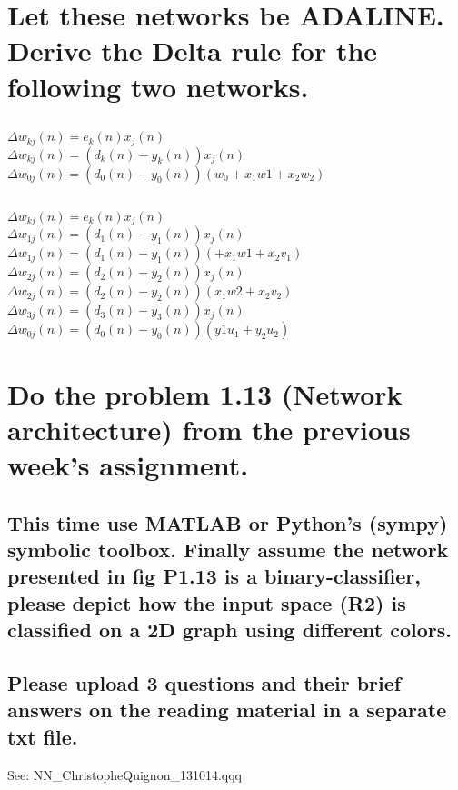 \documentclass{scrartcl}
\begin{document}
\section{Let these networks be ADALINE. Derive the Delta rule for the following two networks.}
\subsection{}
$\Delta w_{kj}(n)=e_{k}(n)x_{j}(n)$\\
$\Delta w_{kj}(n)=(d_{k}(n)-y_{k}(n))x_{j}(n)$\\
$\Delta w_{0j}(n)=(d_{0}(n)-y_{0}(n))
(w_{0}+x_{1}w{1}+x_{2}w_{2})$\\

\subsection{}
$\Delta w_{kj}(n)=e_{k}(n)x_{j}(n)$\\

$\Delta w_{1j}(n)=(d_{1}(n)-y_{1}(n))x_{j}(n)$\\
$\Delta w_{1j}(n)=(d_{1}(n)-y_{1}(n))
(+x_{1}w{1}+x_{2}v_{1})$\\

$\Delta w_{2j}(n)=(d_{2}(n)-y_{2}(n))x_{j}(n)$\\
$\Delta w_{2j}(n)=(d_{2}(n)-y_{2}(n))
(x_{1}w{2}+x_{2}v_{2})$\\



$\Delta w_{3j}(n)=(d_{3}(n)-y_{3}(n))x_{j}(n)$\\
$\Delta w_{0j}(n)=(d_{0}(n)-y_{0}(n))
(y{1}u_{1}+y_{2}u_{2})$\\

\section{Do the problem 1.13 (Network architecture) from the previous week’s assignment.}
\subsection{This time use MATLAB or Python’s (sympy) symbolic toolbox. Finally assume the network
presented in fig P1.13 is a binary-classifier, please depict how the input space (R2) is classified
on a 2D graph using different colors.}



\subsection{Please upload 3 questions and their brief answers on the reading material in a separate txt
file.
}
See:  NN\_ChristopheQuignon\_131014.qqq
\end{document}
